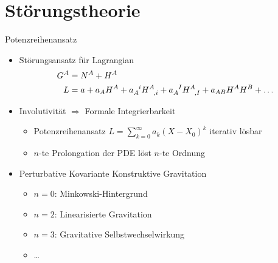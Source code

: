 \documentclass{beamer}
\begin{document}
    \section{Störungstheorie}\label{sec:stoerungstheorie}

    \begin{frame}{Potenzreihenansatz}
        \begin{itemize}
            \item Störungsansatz für Lagrangian
            \setlength{\belowdisplayskip}{-10pt}
            \begin{align*}
                G^A &= N^A + H^A \\
                L &= a + a_A H^A + a_A^{\hphantom Ai} H^A_{\hphantom{A},i} + a_A^{\hphantom AI} H^A_{\hphantom{A},I} + a_{AB} H^A H^B + \ldots
            \end{align*} \pause
            \item Involutivität $\Rightarrow$ Formale Integrierbarkeit
            \begin{itemize}
                \item Potenzreihenansatz $ L = \sum_{k=0}^\infty a_k (X-X_0)^k $ iterativ lösbar
                \item \alert{$n$-te Prolongation der PDE löst $n$-te Ordnung}
            \end{itemize} \pause
            \item Perturbative Kovariante Konstruktive Gravitation
            \begin{itemize}
                \item $n=0$: Minkowski-Hintergrund
                \item $n=2$: Linearisierte Gravitation
                \item $n=3$: Gravitative Selbstwechselwirkung
                \item \ldots
            \end{itemize}
        \end{itemize}
    \end{frame}
\end{document}
